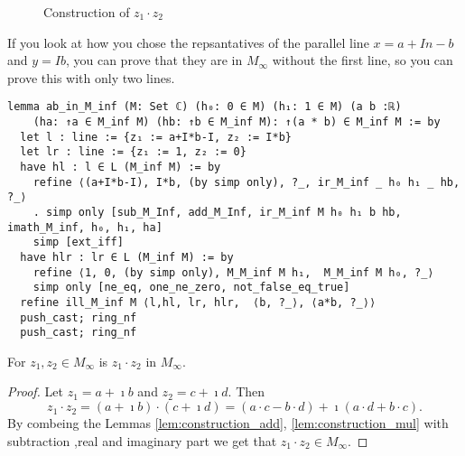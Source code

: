 \begin{figure}[h!]
    \centering
    \caption{Construction of $z_1 \cdot z_2$}
    \label{Fig.5}
\end{figure}

\begin{remark}
    If you look at how you chose the repsantatives of the parallel line $x = a+In-b$ and $y=Ib$, you can prove that they are in $M_{\infty}$ without the first line, so you can prove this with only two lines.
\end{remark}

\begin{lstlisting}
lemma ab_in_M_inf (M: Set ℂ) (h₀: 0 ∈ M) (h₁: 1 ∈ M) (a b :ℝ)
    (ha: ↑a ∈ M_inf M) (hb: ↑b ∈ M_inf M): ↑(a * b) ∈ M_inf M := by
  let l : line := {z₁ := a+I*b-I, z₂ := I*b}
  let lr : line := {z₁ := 1, z₂ := 0}
  have hl : l ∈ L (M_inf M) := by
    refine ⟨(a+I*b-I), I*b, (by simp only), ?_, ir_M_inf _ h₀ h₁ _ hb, ?_⟩
    . simp only [sub_M_Inf, add_M_Inf, ir_M_inf M h₀ h₁ b hb, imath_M_inf, h₀, h₁, ha]
    simp [ext_iff]
  have hlr : lr ∈ L (M_inf M) := by
    refine ⟨1, 0, (by simp only), M_M_inf M h₁,  M_M_inf M h₀, ?_⟩
    simp only [ne_eq, one_ne_zero, not_false_eq_true]
  refine ill_M_inf M ⟨l,hl, lr, hlr,  ⟨b, ?_⟩, ⟨a*b, ?_⟩⟩
  push_cast; ring_nf
  push_cast; ring_nf
\end{lstlisting}

\begin{corollary}
    \label{cor:construction_mul_complex}
    For $z_1, z_2 \in M_{\infty}$ is $z_1 \cdot z_2$ in $M_{\infty}$.
\end{corollary}
\begin{proof}
    Let $z_1 = a + \imath b$ and $z_2 = c + \imath d$. Then $$z_1 \cdot z_2 = (a + \imath b) \cdot (c + \imath d) = (a \cdot c - b \cdot d) + \imath (a \cdot d + b \cdot c).$$
    By combeing the Lemmas \ref{lem:construction_add}, \ref{lem:construction_mul} with subtraction ,real and imaginary part we get that $z_1 \cdot z_2 \in M_{\infty}$.
\end{proof}

